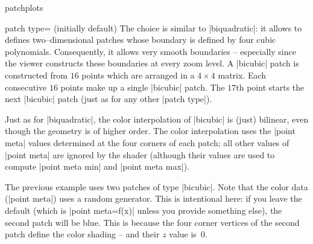{\begin{pgfplotslibrary}{patchplots}
\begin{pgfplotskey}{patch type= (initially default)}
	The choice  is similar to |biquadratic|: it allows to defines two--dimensional patches whose boundary is defined by four cubic polynomials. Consequently, it allows very smooth boundaries -- especially since the viewer constructs these boundaries at every zoom level. A |bicubic| patch is constructed from $16$ points which are arranged in a $4\times4$ matrix. Each consecutive $16$ points make up a single |bicubic| patch. The $17$th point starts the next |bicubic| patch (just as for any other |patch type|).
\begin{codeexample}[]
\end{codeexample}
	Just as for |biquadratic|, the color interpolation of |bicubic| is (just) bilinear, even though the geometry is of higher order. The color interpolation uses the |point meta| values determined at the four corners of each patch; all other values of |point meta| are ignored by the shader (although their values are used to compute |point meta min| and |point meta max|).
\begin{codeexample}[]
\end{codeexample}
	The previous example uses two patches of type |bicubic|. Note that the color data (|point meta|) uses a random generator. This is intentional here: if you leave the default (which is |point meta=f(x)| unless you provide something else), the second patch will be blue. This is because the four corner vertices of the second patch define the color shading -- and their $z$ value is~$0$.


\end{pgfplotskey}
\end{pgfplotslibrary}}
